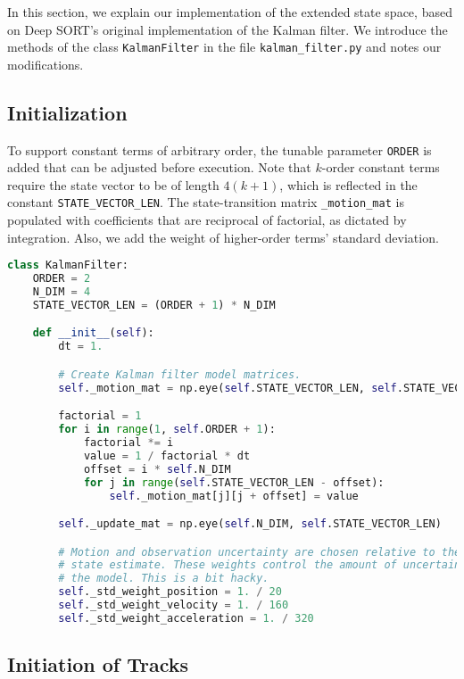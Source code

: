 \documentclass{article}
\numberwithin{algorithm}{section}
\begin{document}
In this section, we explain our implementation of the extended state space, based on Deep SORT's original implementation of the Kalman filter. We introduce the methods of the class \texttt{KalmanFilter} in the file \texttt{kalman\_filter.py} and notes our modifications.

\subsection{Initialization}

To support constant terms of arbitrary order, the tunable parameter \texttt{ORDER} is added that can be adjusted before execution. Note that $k$-order constant terms require the state vector to be of length $4(k + 1)$, which is reflected in the constant \texttt{STATE\_VECTOR\_LEN}. The state-transition matrix \texttt{\_motion\_mat} is populated with coefficients that are reciprocal of factorial, as dictated by integration. Also, we add the weight of higher-order terms' standard deviation.

\begin{lstlisting}[language=Python]
class KalmanFilter:
    ORDER = 2
    N_DIM = 4
    STATE_VECTOR_LEN = (ORDER + 1) * N_DIM

    def __init__(self):
        dt = 1.

        # Create Kalman filter model matrices.
        self._motion_mat = np.eye(self.STATE_VECTOR_LEN, self.STATE_VECTOR_LEN)

        factorial = 1
        for i in range(1, self.ORDER + 1):
            factorial *= i
            value = 1 / factorial * dt
            offset = i * self.N_DIM
            for j in range(self.STATE_VECTOR_LEN - offset):
                self._motion_mat[j][j + offset] = value

        self._update_mat = np.eye(self.N_DIM, self.STATE_VECTOR_LEN)

        # Motion and observation uncertainty are chosen relative to the current
        # state estimate. These weights control the amount of uncertainty in
        # the model. This is a bit hacky.
        self._std_weight_position = 1. / 20
        self._std_weight_velocity = 1. / 160
        self._std_weight_acceleration = 1. / 320
\end{lstlisting}

\subsection{Initiation of Tracks}
\end{document}
